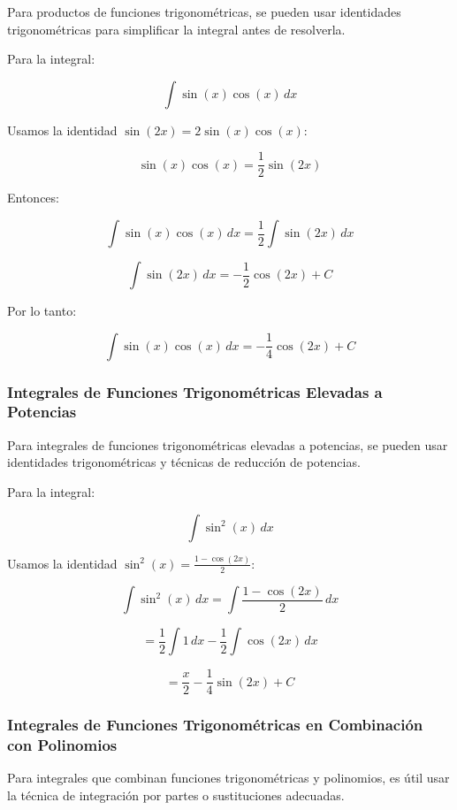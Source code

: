 Para productos de funciones trigonométricas, se pueden usar identidades trigonométricas para simplificar la integral antes de resolverla.

\begin{example}
    Para la integral:

\[
\int \sin(x) \cos(x) \, dx
\]

Usamos la identidad \(\sin(2x) = 2 \sin(x) \cos(x)\):

\[
\sin(x) \cos(x) = \frac{1}{2} \sin(2x)
\]

Entonces:

\[
\int \sin(x) \cos(x) \, dx = \frac{1}{2} \int \sin(2x) \, dx
\]

\[
\int \sin(2x) \, dx = -\frac{1}{2} \cos(2x) + C
\]

Por lo tanto:

\[
\int \sin(x) \cos(x) \, dx = -\frac{1}{4} \cos(2x) + C
\]
\end{example}

\subsubsection{Integrales de Funciones Trigonométricas Elevadas a Potencias}

Para integrales de funciones trigonométricas elevadas a potencias, se pueden usar identidades trigonométricas y técnicas de reducción de potencias.

\begin{example}
    
Para la integral:

\[
\int \sin^2(x) \, dx
\]

Usamos la identidad \(\sin^2(x) = \frac{1 - \cos(2x)}{2}\):

\[
\int \sin^2(x) \, dx = \int \frac{1 - \cos(2x)}{2} \, dx
\]

\[
= \frac{1}{2} \int 1 \, dx - \frac{1}{2} \int \cos(2x) \, dx
\]

\[
= \frac{x}{2} - \frac{1}{4} \sin(2x) + C
\]
\end{example}

\subsubsection{Integrales de Funciones Trigonométricas en Combinación con Polinomios}

Para integrales que combinan funciones trigonométricas y polinomios, es útil usar la técnica de integración por partes o sustituciones adecuadas.

